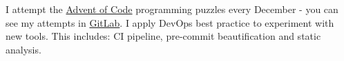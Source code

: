 \descript{ }
\vspace*{-\topsep}  %
\begin{justify}
I attempt the \href{https://adventofcode.com/}{Advent of Code} programming puzzles every December - you can see my attempts in \href{https://gitlab.com/laywill/}{GitLab}.
I apply DevOps best practice to experiment with new tools. This includes: CI pipeline, pre-commit beautification and static analysis.
\end{justify}